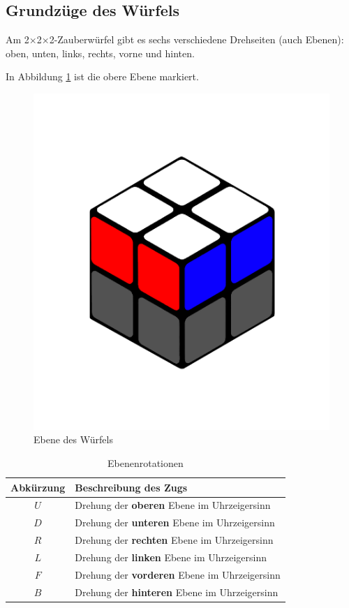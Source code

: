 \documentclass[12pt,a4paper, usenames, dvipsnames]{article}
\newcommand{\Ttwo}{2$\times$2$\times$2-}
\begin{document}
%
%
%
%
%
%
%
%
%
%
%
%
%


\subsection*{Grundzüge des Würfels} 
Am \Ttwo Zauberwürfel gibt es sechs verschiedene Drehseiten (auch Ebenen): oben, unten, links, rechts, vorne und hinten. 

In Abbildung \ref{24} ist die obere Ebene markiert.

\begin{figure}[h]
\centering
\includegraphics[scale=0.1]{ebene.png}
\caption[Ebene des Würfels]{Ebene des Würfels}
\label{24}
\end{figure}

\begin{table}[H]
\centering
\begin{tabular}{cl}
Abkürzung & Beschreibung des Zugs \\
\hline
$U$ & Drehung der \textbf{oberen} Ebene im Uhrzeigersinn \\
$D$ & Drehung der \textbf{unteren} Ebene im Uhrzeigersinn \\
$R$ & Drehung der \textbf{rechten} Ebene im Uhrzeigersinn \\
$L$ & Drehung der \textbf{linken} Ebene im Uhrzeigersinn \\%
$F$ & Drehung der \textbf{vorderen} Ebene im Uhrzeigersinn \\
$B$ & Drehung der \textbf{hinteren} Ebene im Uhrzeigersinn \\
\end{tabular} 
\caption[Ebenenrotationen]{Ebenenrotationen}
\end{table}
\end{document}
